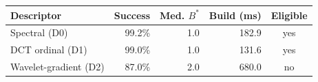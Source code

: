 \begin{tabular}{lrrrc}
\toprule
\textbf{Descriptor} & \textbf{Success} & \textbf{Med. $B^\ast$} & \textbf{Build (ms)} & \textbf{Eligible} \\
\midrule
Spectral (D0) & 99.2\% & 1.0 & 182.9 & yes \\
DCT ordinal (D1) & 99.0\% & 1.0 & 131.6 & yes \\
Wavelet-gradient (D2) & 87.0\% & 2.0 & 680.0 & no \\
\bottomrule
\end{tabular}
